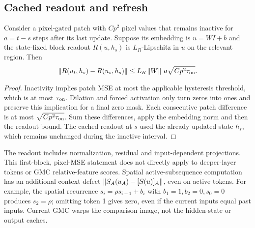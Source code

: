 \subsection{Cached readout and refresh}
\begin{Proposition}\label{prop:cache}
Consider a pixel-gated patch with $C p^2$ pixel values that remains inactive
for $a=t-s$ steps after its last update. Suppose its embedding is $u=WI+b$
and the state-fixed block readout $R(u,h_s)$ is $L_R$-Lipschitz in $u$ on
the relevant region. Then
\begin{equation}\label{eq:cache}
 \norm{R(u_t,h_s)-R(u_s,h_s)}
 \le L_R\norm{W}\,a\sqrt{Cp^2\tau_{\rm on}}.
\end{equation}
\end{Proposition}
\begin{proof}
Inactivity implies patch MSE at most the applicable hysteresis threshold,
which is at most $\tau_{\rm on}$. Dilation and forced activation only turn
zeros into ones and preserve this implication for a final zero mask.
Each consecutive patch difference is at most $\sqrt{Cp^2\tau_{\rm on}}$.
Sum these differences, apply the embedding norm and then the readout bound.
The cached readout at $s$ used the already updated state $h_s$, which remains
unchanged during the inactive interval.
\end{proof}

The readout includes normalization, residual and input-dependent projections.
This first-block, pixel-MSE statement does not directly apply to deeper-layer
tokens or GMC relative-feature scores. Spatial active-subsequence computation
has an additional context defect
$\norm{S_A(u_A)-[S(u)]_A}$, even on active tokens. For example, the spatial
recurrence $s_i=\rho s_{i-1}+b_i$ with $b_1=1,b_2=0,s_0=0$ produces $s_2=\rho$;
omitting token 1 gives zero, even if the current inputs equal past inputs.
Current GMC warps the comparison image, not the hidden-state or output caches.

